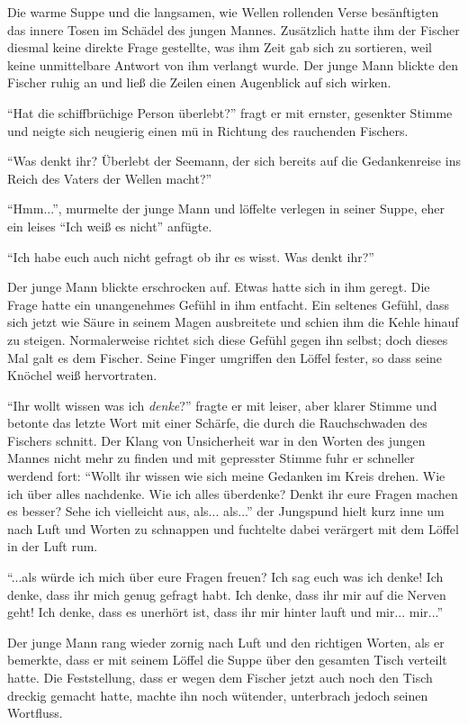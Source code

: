 Die warme Suppe und die langsamen, wie Wellen rollenden Verse besänftigten das innere Tosen im Schädel des jungen Mannes. Zusätzlich hatte ihm der Fischer diesmal keine direkte Frage gestellte, was ihm Zeit gab sich zu sortieren, weil keine unmittelbare Antwort von ihm verlangt wurde.
Der junge Mann blickte den Fischer ruhig an und ließ die Zeilen einen Augenblick auf sich wirken.

``Hat die schiffbrüchige Person überlebt?'' fragt er mit ernster, gesenkter Stimme und neigte sich neugierig einen mü in Richtung des rauchenden Fischers.

``Was denkt ihr? Überlebt der Seemann, der sich bereits auf die Gedankenreise ins Reich des Vaters der Wellen macht?''

``Hmm...'', murmelte der junge Mann und löffelte verlegen in seiner Suppe, eher ein leises ``Ich weiß es nicht'' anfügte.

``Ich habe euch auch nicht gefragt ob ihr es wisst. Was denkt ihr?''

Der junge Mann blickte erschrocken auf. Etwas hatte sich in ihm geregt. Die Frage hatte ein unangenehmes Gefühl in ihm entfacht. Ein seltenes Gefühl, dass sich jetzt wie Säure in seinem Magen ausbreitete und schien ihm die Kehle hinauf zu steigen. Normalerweise richtet sich diese Gefühl gegen ihn selbst; doch dieses Mal galt es dem Fischer. Seine Finger umgriffen den Löffel fester, so dass seine Knöchel weiß hervortraten.

``Ihr wollt wissen was ich \textit{denke}?'' fragte er mit leiser, aber klarer Stimme und betonte das letzte Wort mit einer Schärfe, die durch die Rauchschwaden des Fischers schnitt. Der Klang von Unsicherheit war in den Worten des jungen Mannes nicht mehr zu finden und mit gepresster Stimme fuhr er schneller werdend fort:
``Wollt ihr wissen wie sich meine Gedanken im Kreis drehen. Wie ich über alles nachdenke. Wie ich alles überdenke? Denkt ihr eure Fragen machen es besser? Sehe ich vielleicht aus, als... als...''  der Jungspund hielt kurz inne um nach Luft und Worten zu schnappen und fuchtelte dabei verärgert mit dem Löffel in der Luft rum.

``...als würde ich mich über eure Fragen freuen? Ich sag euch was ich denke! Ich denke, dass ihr mich genug gefragt habt. Ich denke, dass ihr mir auf die Nerven geht! Ich denke, dass es unerhört ist, dass ihr mir hinter lauft und mir... mir...'' 

Der junge Mann rang wieder zornig nach Luft und den richtigen Worten, als er bemerkte, dass er mit seinem Löffel die Suppe über den gesamten Tisch verteilt hatte. Die Feststellung, dass er wegen dem Fischer jetzt auch noch den Tisch dreckig gemacht hatte, machte ihn noch wütender, unterbrach jedoch seinen Wortfluss.


